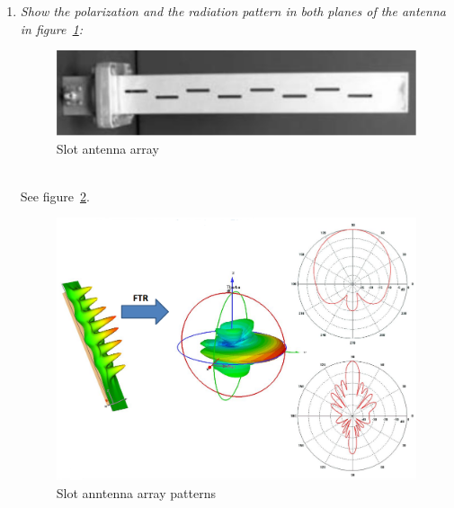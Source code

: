 \documentclass[11pt,a4paper]{article}
\begin{document}
\begin{enumerate}
    \item \emph{Show the polarization and the radiation pattern in both planes of the antenna in figure~\ref{fig:slot-antenna}:}
    \begin{figure}[!ht]
        \centering
        \includegraphics[width=.7\textwidth]{src/slot-antenna-array.png}
        \caption{\label{fig:slot-antenna}Slot antenna array}
    \end{figure}\\
    See figure~\ref{fig:slot-antenna-array}.
    \begin{figure}[!ht]
        \centering
        \includegraphics[width=.7\textwidth]{src/slot-antenna-array-patterns.png}
        \caption{\label{fig:slot-antenna-array}Slot anntenna array patterns}
    \end{figure}


\end{enumerate}
\end{document}
